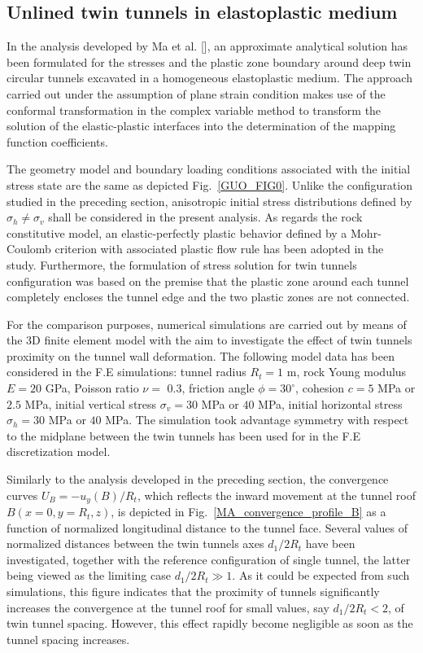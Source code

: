 \documentclass[a4paper,fleqn]{cas-sc}
\begin{document}
\subsection{Unlined twin tunnels in elastoplastic medium}\label{}


In the analysis developed by Ma et al. [], an approximate analytical solution has been formulated for the stresses and the plastic zone boundary around deep twin circular tunnels excavated in a homogeneous elastoplastic medium. The approach carried out under the assumption of plane strain condition makes use of the conformal transformation in the complex variable method to transform the solution of the elastic-plastic interfaces into the determination of the mapping function coefficients.

The geometry model and boundary loading conditions associated with the initial stress state are the same as depicted Fig.~\ref{GUO_FIG0}. Unlike the configuration studied in the preceding section, anisotropic initial stress distributions defined by $\sigma_h \neq \sigma_v$ shall be considered in the present analysis. As regards the rock constitutive model, an elastic-perfectly plastic behavior defined by a Mohr-Coulomb criterion with associated plastic flow rule has been adopted in the study.  Furthermore, the formulation of stress solution for twin tunnels configuration was based on the premise that the plastic zone around each tunnel completely encloses the tunnel edge and the two plastic zones are not connected.

For the comparison purposes, numerical simulations are carried out by means of the 3D finite element model with the aim to investigate the effect of twin tunnels proximity on the tunnel wall deformation. The following model data has been considered in the F.E simulations: tunnel radius $R_t = 1$ m, rock Young modulus $E = 20$ GPa, Poisson ratio $\nu =$ 0.3, friction angle $\phi = 30^\circ$, cohesion $c = 5$ MPa or $2.5$ MPa, initial vertical stress $\sigma_v =30$ MPa or $40$ MPa, initial horizontal stress $\sigma_h = 30$ MPa or $40$ MPa. The simulation took advantage symmetry with respect to the midplane between the twin tunnels has been used for in the F.E discretization model.

Similarly to the analysis developed in the preceding section, the convergence curves $U_B=-u_y(B)/R_t$, which reflects the inward movement at the tunnel roof $B(x=0, y=R_t, z)$, is depicted in Fig.~\ref{MA_convergence_profile_B} as a function of normalized longitudinal distance to the tunnel face. Several values of normalized distances between the twin tunnels axes $d_1/2R_t$ have been investigated, together with the reference configuration of single tunnel, the latter being viewed as the limiting case $d_1/2R_t \gg 1$. As it could be expected from such simulations, this figure indicates that the proximity of tunnels significantly increases the convergence at the tunnel roof for small values, say $d_1/2R_t < 2$, of twin tunnel spacing. However, this effect rapidly become negligible as soon as the tunnel spacing increases.
\end{document}
